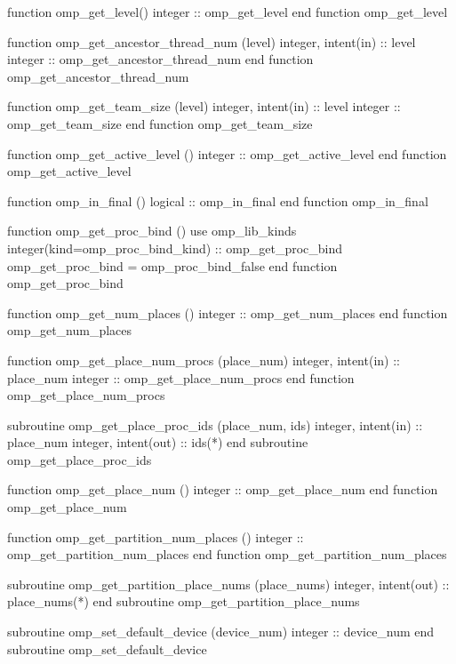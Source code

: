 {\begin{codepar}
          function omp\_get\_level()
           integer :: omp\_get\_level
          end function omp\_get\_level

          function omp\_get\_ancestor\_thread\_num (level)
           integer, intent(in) :: level
           integer :: omp\_get\_ancestor\_thread\_num
          end function omp\_get\_ancestor\_thread\_num

          function omp\_get\_team\_size (level)
           integer, intent(in) :: level
           integer :: omp\_get\_team\_size
          end function omp\_get\_team\_size

          function omp\_get\_active\_level ()
           integer :: omp\_get\_active\_level
          end function omp\_get\_active\_level

          function omp\_in\_final ()
           logical :: omp\_in\_final
          end function omp\_in\_final

          function omp\_get\_proc\_bind ()
           use omp\_lib\_kinds
           integer(kind=omp\_proc\_bind\_kind) :: omp\_get\_proc\_bind
           omp\_get\_proc\_bind = omp\_proc\_bind\_false
          end function omp\_get\_proc\_bind

          function omp\_get\_num\_places ()
          integer :: omp\_get\_num\_places
          end function omp\_get\_num\_places

          function omp\_get\_place\_num\_procs (place\_num)
          integer, intent(in) :: place\_num
          integer :: omp\_get\_place\_num\_procs
          end function omp\_get\_place\_num\_procs

          subroutine omp\_get\_place\_proc\_ids (place\_num, ids)
          integer, intent(in) :: place\_num
          integer, intent(out) :: ids(*)
          end subroutine omp\_get\_place\_proc\_ids

          function omp\_get\_place\_num ()
          integer :: omp\_get\_place\_num
          end function omp\_get\_place\_num

          function omp\_get\_partition\_num\_places ()
          integer :: omp\_get\_partition\_num\_places
          end function omp\_get\_partition\_num\_places

          subroutine omp\_get\_partition\_place\_nums (place\_nums)
          integer, intent(out) :: place\_nums(*)
          end subroutine omp\_get\_partition\_place\_nums

          subroutine omp\_set\_default\_device (device\_num)
           integer :: device\_num
          end subroutine omp\_set\_default\_device


\end{codepar}}
